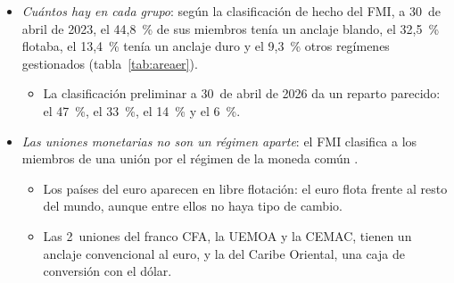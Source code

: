 \documentclass[11pt]{article}
\begin{document}
\begin{itemize}
\item \emph{Cuántos hay en cada grupo}: según la clasificación de hecho del FMI, a 30~de abril de 2023, el 44,8~\% de sus miembros tenía un anclaje blando, el 32,5~\% flotaba, el 13,4~\% tenía un anclaje duro y el 9,3~\% otros regímenes gestionados\nocite{FMI2024AREAER2023} (tabla~\ref{tab:areaer}).
  \begin{itemize}
  \item La clasificación preliminar a 30~de abril de 2026 da un reparto parecido: el 47~\%, el 33~\%, el 14~\% y el 6~\%\nocite{FMI2026InformeAnual}.
  \end{itemize}
\item \emph{Las uniones monetarias no son un régimen aparte}: el FMI clasifica a los miembros de una unión por el régimen de la moneda común .
  \begin{itemize}
  \item Los países del euro aparecen en libre flotación: el euro flota frente al resto del mundo, aunque entre ellos no haya tipo de cambio.
  \item Las 2~uniones del franco CFA, la UEMOA y la CEMAC, tienen un anclaje convencional al euro, y la del Caribe Oriental, una caja de conversión con el dólar\nocite{FMI2024AREAER2023}.
  \end{itemize}
\end{itemize}
\end{document}
